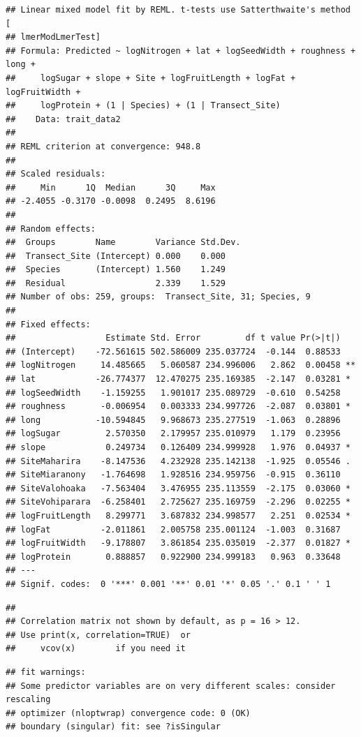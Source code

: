 \documentclass[
  12pt,
]{article}
\begin{document}
\begin{verbatim}
## Linear mixed model fit by REML. t-tests use Satterthwaite's method [
## lmerModLmerTest]
## Formula: Predicted ~ logNitrogen + lat + logSeedWidth + roughness + long +  
##     logSugar + slope + Site + logFruitLength + logFat + logFruitWidth +  
##     logProtein + (1 | Species) + (1 | Transect_Site)
##    Data: trait_data2
## 
## REML criterion at convergence: 948.8
## 
## Scaled residuals: 
##     Min      1Q  Median      3Q     Max 
## -2.4055 -0.3170 -0.0098  0.2495  8.6196 
## 
## Random effects:
##  Groups        Name        Variance Std.Dev.
##  Transect_Site (Intercept) 0.000    0.000   
##  Species       (Intercept) 1.560    1.249   
##  Residual                  2.339    1.529   
## Number of obs: 259, groups:  Transect_Site, 31; Species, 9
## 
## Fixed effects:
##                  Estimate Std. Error         df t value Pr(>|t|)   
## (Intercept)    -72.561615 502.586009 235.037724  -0.144  0.88533   
## logNitrogen     14.485665   5.060587 234.996006   2.862  0.00458 **
## lat            -26.774377  12.470275 235.169385  -2.147  0.03281 * 
## logSeedWidth    -1.159255   1.901017 235.089729  -0.610  0.54258   
## roughness       -0.006954   0.003333 234.997726  -2.087  0.03801 * 
## long           -10.594845   9.968673 235.277519  -1.063  0.28896   
## logSugar         2.570350   2.179957 235.010979   1.179  0.23956   
## slope            0.249734   0.126409 234.999928   1.976  0.04937 * 
## SiteMaharira    -8.147536   4.232928 235.142138  -1.925  0.05546 . 
## SiteMiaranony   -1.764698   1.928516 234.959756  -0.915  0.36110   
## SiteValohoaka   -7.563404   3.476955 235.113559  -2.175  0.03060 * 
## SiteVohiparara  -6.258401   2.725627 235.169759  -2.296  0.02255 * 
## logFruitLength   8.299771   3.687832 234.998577   2.251  0.02534 * 
## logFat          -2.011861   2.005758 235.001124  -1.003  0.31687   
## logFruitWidth   -9.178807   3.861854 235.035019  -2.377  0.01827 * 
## logProtein       0.888857   0.922900 234.999183   0.963  0.33648   
## ---
## Signif. codes:  0 '***' 0.001 '**' 0.01 '*' 0.05 '.' 0.1 ' ' 1
\end{verbatim}

\begin{verbatim}
## 
## Correlation matrix not shown by default, as p = 16 > 12.
## Use print(x, correlation=TRUE)  or
##     vcov(x)        if you need it
\end{verbatim}

\begin{verbatim}
## fit warnings:
## Some predictor variables are on very different scales: consider rescaling
## optimizer (nloptwrap) convergence code: 0 (OK)
## boundary (singular) fit: see ?isSingular
\end{verbatim}
\end{document}

